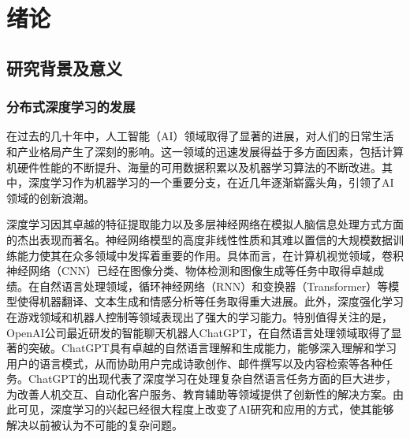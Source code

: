 \chapter{绪论}
\section{研究背景及意义}
\subsection{分布式深度学习的发展} \label{subsection_1_1_1}

在过去的几十年中，人工智能（AI）领域取得了显著的进展，对人们的日常生活和产业格局产生了深刻的影响。这一领域的迅速发展得益于多方面因素，包括计算机硬件性能的不断提升、海量的可用数据积累以及机器学习算法的不断改进。其中，深度学习作为机器学习的一个重要分支，在近几年逐渐崭露头角，引领了AI领域的创新浪潮。


深度学习因其卓越的特征提取能力以及多层神经网络在模拟人脑信息处理方式方面的杰出表现而著名\cite{fukushima1980neocognitron}。神经网络模型的高度非线性性质和其难以置信的大规模数据训练能力使其在众多领域中发挥着重要的作用。具体而言，在计算机视觉领域，卷积神经网络（CNN）\cite{szegedy2015going, simonyan2014very, he2016deep, ren2015faster}已经在图像分类、物体检测和图像生成等任务中取得卓越成绩。在自然语言处理领域，循环神经网络（RNN）\cite{bahdanau2014neural, graves2013generating, socher2013recursive}和变换器（Transformer）\cite{vaswani2017attention, devlin2018bert}等模型使得机器翻译、文本生成和情感分析等任务取得重大进展。此外，深度强化学习在游戏领域和机器人控制等领域表现出了强大的学习能力\cite{mnih2013playing, lillicrap2015continuous, haarnoja2018soft}。特别值得关注的是，OpenAI公司最近研发的智能聊天机器人ChatGPT，在自然语言处理领域取得了显著的突破。ChatGPT具有卓越的自然语言理解和生成能力\cite{liu2023summary}，能够深入理解和学习用户的语言模式，从而协助用户完成诗歌创作、邮件撰写以及内容检索等各种任务。ChatGPT的出现代表了深度学习在处理复杂自然语言任务方面的巨大进步，为改善人机交互、自动化客户服务、教育辅助等领域提供了创新性的解决方案。由此可见，深度学习的兴起已经很大程度上改变了AI研究和应用的方式，使其能够解决以前被认为不可能的复杂问题。

